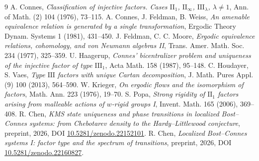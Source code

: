 \documentclass[11pt]{amsart}
\numberwithin{equation}{section}
\theoremstyle{definition}
\theoremstyle{remark}
\begin{document}
\begin{thebibliography}{9}
 A. Connes, \emph{Classification of injective factors. Cases $\mathrm{II}_1$, $\mathrm{II}_\infty$, $\mathrm{III}_\lambda$, $\lambda\ne1$}, Ann. of Math. (2) 104 (1976), 73--115.
 A. Connes, J. Feldman, B. Weiss, \emph{An amenable equivalence relation is generated by a single transformation}, Ergodic Theory Dynam. Systems 1 (1981), 431--450.
 J. Feldman, C. C. Moore, \emph{Ergodic equivalence relations, cohomology, and von Neumann algebras II}, Trans. Amer. Math. Soc. 234 (1977), 325--359.
 U. Haagerup, \emph{Connes' bicentralizer problem and uniqueness of the injective factor of type $\mathrm{III}_1$}, Acta Math. 158 (1987), 95--148.
 C. Houdayer, S. Vaes, \emph{Type $\mathrm{III}$ factors with unique Cartan decomposition}, J. Math. Pures Appl. (9) 100 (2013), 564--590.
 W. Krieger, \emph{On ergodic flows and the isomorphism of factors}, Math. Ann. 223 (1976), 19--70.
 S. Popa, \emph{Strong rigidity of $\mathrm{II}_1$ factors arising from malleable actions of $w$-rigid groups I}, Invent. Math. 165 (2006), 369--408.
 R. Chen, \emph{KMS state uniqueness and phase transitions in localized Bost--Connes systems: from Chebotarev density to the Hardy--Littlewood conjecture}, preprint, 2026, DOI \href{https://doi.org/10.5281/zenodo.22152101}{10.5281/zenodo.22152101}.
 R. Chen, \emph{Localized Bost--Connes systems I: factor type and the spectrum of transitions}, preprint, 2026, DOI \href{https://doi.org/10.5281/zenodo.22160827}{10.5281/zenodo.22160827}.
\end{thebibliography}
\end{document}
